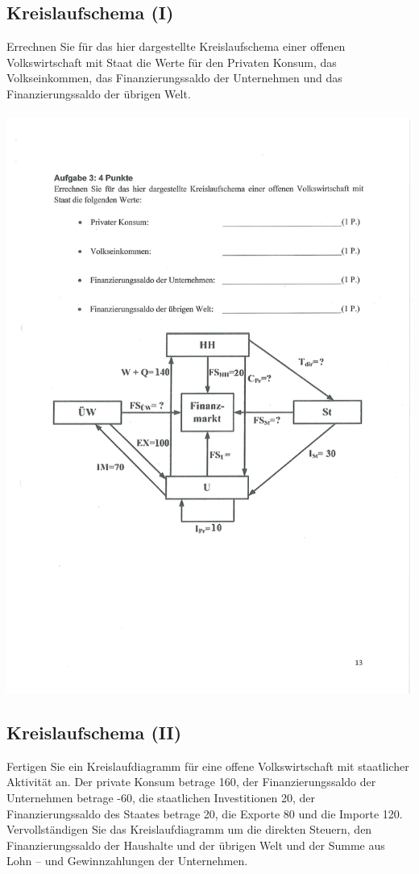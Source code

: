 \documentclass{scrartcl}
\begin{document}
\subsection{Kreislaufschema (I)}
Errechnen Sie für das hier dargestellte Kreislaufschema einer offenen Volkswirtschaft mit Staat die Werte für den Privaten Konsum, das Volkseinkommen, das Finanzierungssaldo der Unternehmen und das Finanzierungssaldo der übrigen Welt.\\~\\
\includegraphics[width=\textwidth]{Bilder/Klassik_Kreislauf_Diagramm_Aufgabe.pdf}

\subsection{Kreislaufschema (II)}
Fertigen Sie ein Kreislaufdiagramm für eine offene Volkswirtschaft mit staatlicher Aktivität an. Der private Konsum betrage 160, der Finanzierungssaldo der Unternehmen betrage -60, die staatlichen Investitionen 20, der Finanzierungssaldo des Staates betrage 20, die Exporte 80 und die Importe 120. Vervollständigen Sie das Kreislaufdiagramm um die direkten Steuern, den Finanzierungssaldo der Haushalte und der übrigen Welt und der Summe aus Lohn – und Gewinnzahlungen der Unternehmen.
\end{document}
